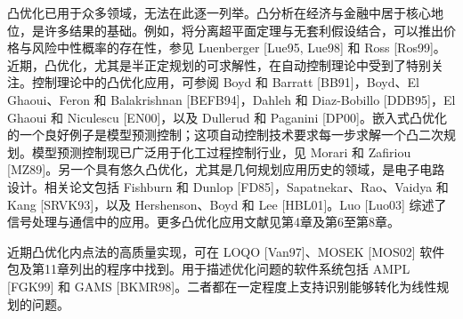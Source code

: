 凸优化已用于众多领域，无法在此逐一列举。凸分析在经济与金融中居于核心地位，是许多结果的基础。例如，将分离超平面定理与无套利假设结合，可以推出价格与风险中性概率的存在性，参见 Luenberger [Lue95, Lue98] 和 Ross [Ros99]。近期，凸优化，尤其是半正定规划的可求解性，在自动控制理论中受到了特别关注。控制理论中的凸优化应用，可参阅 Boyd 和 Barratt [BB91]，Boyd、El Ghaoui、Feron 和 Balakrishnan [BEFB94]，Dahleh 和 Diaz-Bobillo [DDB95]，El Ghaoui 和 Niculescu [EN00]，以及 Dullerud 和 Paganini [DP00]。嵌入式凸优化的一个良好例子是模型预测控制；这项自动控制技术要求每一步求解一个凸二次规划。模型预测控制现已广泛用于化工过程控制行业，见 Morari 和 Zafiriou [MZ89]。另一个具有悠久凸优化，尤其是几何规划应用历史的领域，是电子电路设计。相关论文包括 Fishburn 和 Dunlop [FD85]，Sapatnekar、Rao、Vaidya 和 Kang [SRVK93]，以及 Hershenson、Boyd 和 Lee [HBL01]。Luo [Luo03] 综述了信号处理与通信中的应用。更多凸优化应用文献见第4章及第6至第8章。

近期凸优化内点法的高质量实现，可在 LOQO [Van97]、MOSEK [MOS02] 软件包及第11章列出的程序中找到。用于描述优化问题的软件系统包括 AMPL [FGK99] 和 GAMS [BKMR98]。二者都在一定程度上支持识别能够转化为线性规划的问题。

